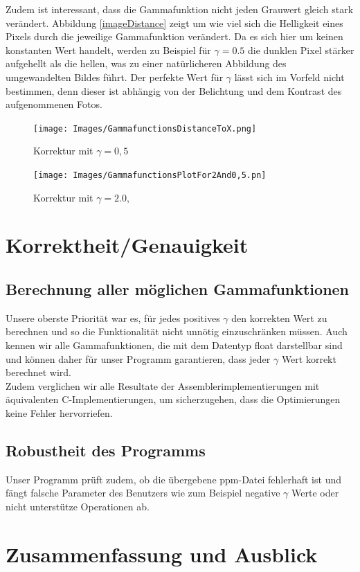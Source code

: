 \documentclass[course=erap]{aspdoc}
\begin{document}
	\noindent
	Zudem ist interessant, dass die Gammafunktion nicht jeden Grauwert gleich stark verändert. Abbildung \ref{imageDistance} zeigt um wie viel sich die Helligkeit eines Pixels durch die jeweilige Gammafunktion verändert. Da es sich hier um keinen konstanten Wert handelt, werden zu Beispiel für $\gamma = 0.5$ die dunklen Pixel stärker aufgehellt als die hellen, was zu einer natürlicheren Abbildung des umgewandelten Bildes führt.  
	\newline
	Der perfekte Wert für $\gamma$ lässt sich im Vorfeld nicht bestimmen, denn dieser ist abhängig von der Belichtung und dem Kontrast des aufgenommenen Fotos.
	\begin{figure}[h]
		\begin{minipage}{0.49\linewidth}
			\centering
			\texttt{[image: Images/GammafunctionsDistanceToX.png]}
			\caption{Korrektur mit $\gamma = 0,5$}
			\label{imageDistance}
		\end{minipage}
		\centering
		\begin{minipage}{0.49\linewidth}
			\centering
			\texttt{[image: Images/GammafunctionsPlotFor2And0,5.pn]}
			\caption{Korrektur mit $\gamma = 2.0,$}
			\label{GammafunctionsPlot}
		\end{minipage}
	\end{figure}
	\section{Korrektheit/Genauigkeit}
	\subsection{Berechnung aller möglichen Gammafunktionen}
	Unsere oberste Priorität war es, für jedes positives $\gamma$ den korrekten Wert zu berechnen und so die Funktionalität nicht unnötig einzuschränken müssen. Auch kennen wir alle Gammafunktionen, die mit dem Datentyp float darstellbar sind und können daher für unser Programm garantieren, dass jeder $\gamma$ Wert korrekt berechnet wird. 
	\\
	Zudem verglichen wir alle Resultate der Assemblerimplementierungen mit äquivalenten C-Implementierungen, um sicherzugehen, dass die Optimierungen keine Fehler hervorriefen.  
	\subsection{Robustheit des Programms}
	Unser Programm prüft zudem, ob die übergebene ppm-Datei fehlerhaft ist und fängt falsche Parameter des Benutzers wie zum Beispiel negative $\gamma$ Werte oder nicht unterstütze Operationen ab. 
		\section{Zusammenfassung und Ausblick}
	
	
	
	{}
	\printbibliography
\end{document}
